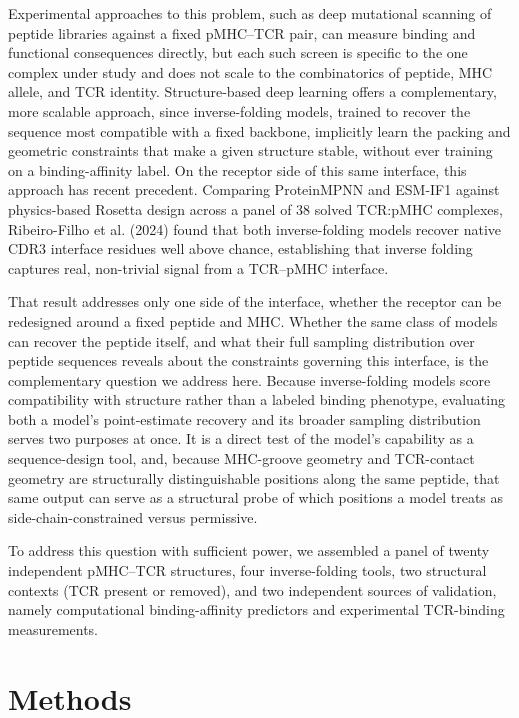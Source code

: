 \documentclass[letterpaper]{article}
\begin{document}
Experimental approaches to this problem, such as deep mutational scanning of peptide libraries against a
fixed pMHC--TCR pair, can measure binding and functional consequences directly, but each such screen is
specific to the one complex under study and does not scale to the combinatorics of peptide, MHC allele,
and TCR identity. Structure-based deep learning offers a complementary, more scalable approach, since
inverse-folding models, trained to recover the sequence most compatible with a fixed backbone, implicitly
learn the packing and geometric constraints that make a given structure stable, without ever
training on a binding-affinity label. On the receptor side of this same interface, this approach has
recent precedent. Comparing ProteinMPNN and ESM-IF1 against physics-based Rosetta design across a panel of
38 solved TCR:pMHC complexes, Ribeiro-Filho et al. (2024) found that both inverse-folding models recover
native CDR3 interface residues well above chance, establishing that inverse folding captures real,
non-trivial signal from a TCR--pMHC interface.

That result addresses only one side of the interface, whether the receptor can be redesigned around a
fixed peptide and MHC. Whether the same class of models can recover the peptide itself, and what their
full sampling distribution over peptide sequences reveals about the constraints governing this interface,
is the complementary question we address here. Because inverse-folding models score compatibility with
structure rather than a labeled binding phenotype, evaluating both a model's point-estimate recovery and
its broader sampling distribution serves two purposes at once. It is a direct test of the model's
capability as a sequence-design tool, and, because MHC-groove geometry and TCR-contact geometry are
structurally distinguishable positions along the same peptide, that same output can serve as a structural
probe of which positions a model treats as side-chain-constrained versus permissive.

To address this question with sufficient power, we assembled a panel of twenty independent pMHC--TCR
structures, four inverse-folding tools, two structural contexts (TCR present or removed), and two
independent sources of validation, namely computational binding-affinity predictors and experimental
TCR-binding measurements.

\section{Methods}
\label{sec:methods}
\end{document}
